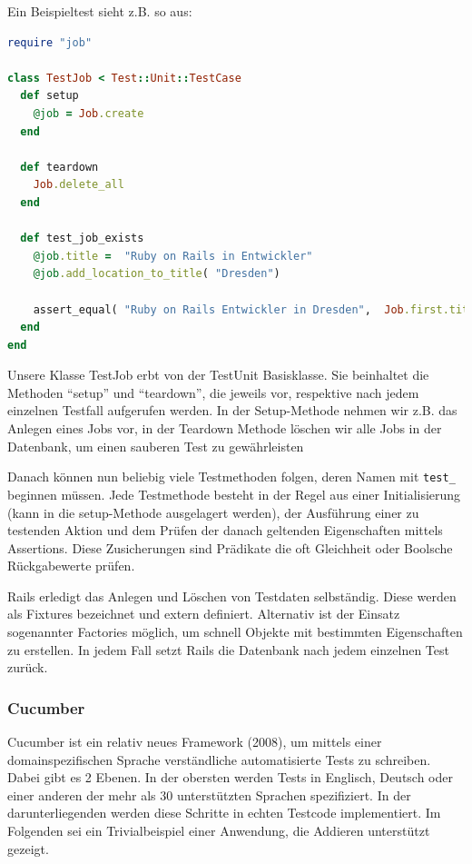 Ein Beispieltest sieht z.B. so aus:
\begin{lstlisting}[language=Ruby,label=Testen mit Test::Unit,caption=Testen mit Test::Unit in Ruby]
require "job"

class TestJob < Test::Unit::TestCase
  def setup
    @job = Job.create
  end
  
  def teardown
    Job.delete_all
  end
  
  def test_job_exists
    @job.title =  "Ruby on Rails in Entwickler"
    @job.add_location_to_title( "Dresden")
    
    assert_equal( "Ruby on Rails Entwickler in Dresden",  Job.first.title)
  end
end
\end{lstlisting}
Unsere Klasse TestJob erbt von der TestUnit Basisklasse. Sie beinhaltet die Methoden "`setup"' und "`teardown"', die jeweils vor, respektive nach jedem einzelnen Testfall aufgerufen werden.
In der Setup-Methode nehmen wir z.B. das Anlegen eines Jobs vor, in der Teardown Methode löschen wir alle Jobs in der Datenbank, um einen sauberen Test zu gewährleisten

Danach können nun beliebig viele Testmethoden folgen, deren Namen mit \texttt{test\_} beginnen müssen.
Jede Testmethode besteht in der Regel aus einer Initialisierung (kann in die setup-Methode ausgelagert werden), der Ausführung einer zu testenden Aktion und dem Prüfen der danach geltenden Eigenschaften mittels Assertions. Diese Zusicherungen sind Prädikate die oft Gleichheit oder Boolsche Rückgabewerte prüfen.


Rails erledigt das Anlegen und Löschen von Testdaten selbständig. Diese werden als Fixtures bezeichnet und extern definiert. Alternativ ist der Einsatz sogenannter Factories möglich, um schnell Objekte mit bestimmten Eigenschaften zu erstellen. In jedem Fall setzt Rails die Datenbank nach jedem einzelnen Test zurück.


\subsubsection{Cucumber}

Cucumber ist ein relativ neues Framework (2008), um mittels einer domainspezifischen Sprache verständliche automatisierte Tests zu schreiben. Dabei gibt es 2 Ebenen. In der obersten werden Tests in Englisch, Deutsch oder einer anderen der mehr als 30 unterstützten Sprachen spezifiziert. In der darunterliegenden werden diese Schritte in echten Testcode implementiert. Im Folgenden sei ein Trivialbeispiel einer Anwendung, die Addieren unterstützt gezeigt.

